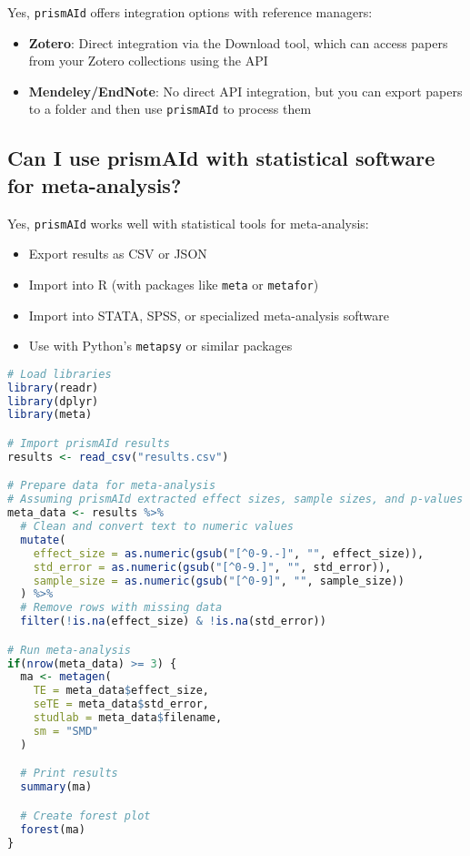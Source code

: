 Yes, \texttt{prismAId} offers integration options with reference managers:

\begin{itemize}
    \item \textbf{Zotero}: Direct integration via the Download tool, which can access papers from your Zotero collections using the API
    \item \textbf{Mendeley/EndNote}: No direct API integration, but you can export papers to a folder and then use \texttt{prismAId} to process them
\end{itemize}


\subsection{Can I use prismAId with statistical software for meta-analysis?}

Yes, \texttt{prismAId} works well with statistical tools for meta-analysis:

\begin{itemize}
    \item Export results as CSV or JSON
    \item Import into R (with packages like \texttt{meta} or \texttt{metafor})
    \item Import into STATA, SPSS, or specialized meta-analysis software
    \item Use with Python's \texttt{metapsy} or similar packages
\end{itemize}

\begin{commandbox}
\begin{lstlisting}[language=R]
# Load libraries
library(readr)
library(dplyr)
library(meta)

# Import prismAId results
results <- read_csv("results.csv")

# Prepare data for meta-analysis
# Assuming prismAId extracted effect sizes, sample sizes, and p-values
meta_data <- results %>%
  # Clean and convert text to numeric values
  mutate(
    effect_size = as.numeric(gsub("[^0-9.-]", "", effect_size)),
    std_error = as.numeric(gsub("[^0-9.]", "", std_error)),
    sample_size = as.numeric(gsub("[^0-9]", "", sample_size))
  ) %>%
  # Remove rows with missing data
  filter(!is.na(effect_size) & !is.na(std_error))

# Run meta-analysis
if(nrow(meta_data) >= 3) {
  ma <- metagen(
    TE = meta_data$effect_size,
    seTE = meta_data$std_error,
    studlab = meta_data$filename,
    sm = "SMD"
  )

  # Print results
  summary(ma)

  # Create forest plot
  forest(ma)
}
\end{lstlisting}
\end{commandbox}

